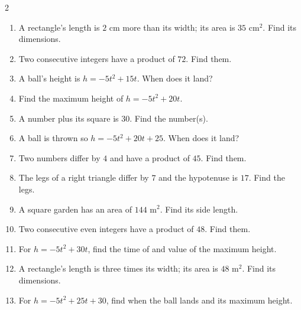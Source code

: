 \documentclass[11pt]{article}
\begin{document}
\clearpage
{}

\begin{recapbox}
\begin{multicols}{2}
\small
\begin{enumerate}[leftmargin=*,itemsep=3pt]
  \item A rectangle's length is $2$ cm more than its width; its area is $35$ cm$^2$. Find its dimensions.
  \item Two consecutive integers have a product of $72$. Find them.
  \item A ball's height is $h=-5t^2+15t$. When does it land?
  \item Find the maximum height of $h=-5t^2+20t$.
  \item A number plus its square is $30$. Find the number(s).
  \item A ball is thrown so $h=-5t^2+20t+25$. When does it land?
  \item Two numbers differ by $4$ and have a product of $45$. Find them.
  \item The legs of a right triangle differ by $7$ and the hypotenuse is $17$. Find the legs.
  \item A square garden has an area of $144$ m$^2$. Find its side length.
  \item Two consecutive even integers have a product of $48$. Find them.
  \item For $h=-5t^2+30t$, find the time of and value of the maximum height.
  \item A rectangle's length is three times its width; its area is $48$ m$^2$. Find its dimensions.
  \item For $h=-5t^2+25t+30$, find when the ball lands and its maximum height.
\end{enumerate}
\end{multicols}
\end{recapbox}
\end{document}
